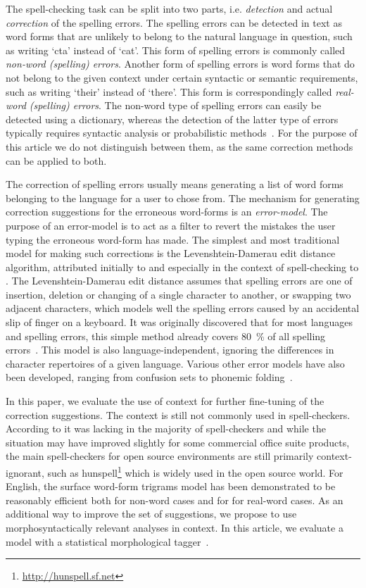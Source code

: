 \documentclass{llncs}
\begin{document}
The spell-checking task can be split into two parts, i.e. \emph{detection} and
actual \emph{correction} of the spelling errors. The spelling errors can be
detected in text as word forms that are unlikely to belong to the
natural language in question, such as writing `cta' instead of `cat'. This form
of spelling errors is commonly called \emph{non-word (spelling) errors}.
Another form of spelling errors is word forms that do not belong to the given
context under certain syntactic or semantic requirements, such as writing
`their' instead of `there'. This form is correspondingly called \emph{real-word
(spelling) errors}. The non-word type of spelling errors can easily be detected
using a dictionary, whereas the detection of the latter type of errors typically
requires syntactic analysis or probabilistic methods~\cite{mitton/2009}. For
the purpose of this article we do not distinguish between them, as the same
correction methods can be applied to both.

The correction of spelling errors usually means generating a list of word forms
belonging to the language for a user to chose from. The mechanism for
generating correction suggestions for the erroneous word-forms is an
\emph{error-model}. The purpose of an error-model is to act as a filter to
revert the mistakes the user typing the erroneous word-form has made.  The
simplest and most traditional model for making such corrections is the
Levenshtein-Damerau edit distance algorithm, attributed initially to
\cite{levenshtein/1966} and especially in the context of spell-checking to
\cite{damerau/1964}. The Levenshtein-Damerau edit distance assumes that
spelling errors are one of insertion, deletion or changing of a single
character to another, or swapping two adjacent characters, which models well
the spelling errors caused by an accidental slip of finger on a keyboard. It
was originally discovered that for most languages and spelling errors, this
simple method already covers 80~\% of all spelling errors~\cite{damerau/1964}.
This model is also language-independent, ignoring the differences in character
repertoires of a given language. Various other error models have also been
developed, ranging from confusion sets to phonemic folding~\cite{kukich/1992}.

In this paper, we evaluate the use of context for further fine-tuning of the
correction suggestions. The context is still not commonly used in
spell-checkers. According to \cite{kukich/1992} it was lacking in the majority
of spell-checkers and while the situation may have improved slightly for some
commercial office suite products, the main spell-checkers for open source
environments are still primarily context-ignorant, such as
hunspell\footnote{\url{http://hunspell.sf.net}} which is widely used in the
open source world.  For English, the surface word-form trigrams model has been
demonstrated to be reasonably efficient both for non-word cases
\cite{church/1991} and for for real-word cases\cite{mays/1991}. As an
additional way to improve the set of suggestions, we propose to use
morphosyntactically relevant analyses in context. In this article, we evaluate
a model with a statistical morphological tagger~\cite{silfverberg/2011}.
\end{document}
